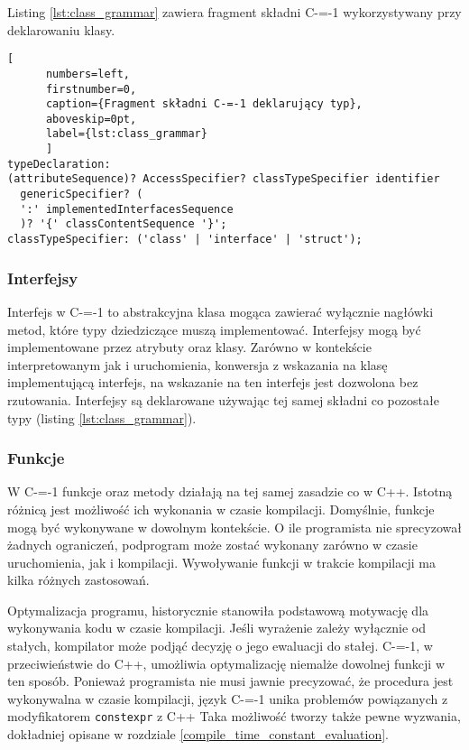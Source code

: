 Listing \ref{lst:class_grammar} zawiera fragment składni C-=-1 wykorzystywany przy deklarowaniu klasy.

\begin{minipage}{\linewidth}
  
	\begin{lstlisting}[
	  numbers=left,
	  firstnumber=0,
	  caption={Fragment składni C-=-1 deklarujący typ},
	  aboveskip=0pt,
	  label={lst:class_grammar}
	  ]
typeDeclaration:
(attributeSequence)? AccessSpecifier? classTypeSpecifier identifier 
  genericSpecifier? (
  ':' implementedInterfacesSequence
  )? '{' classContentSequence '}';
classTypeSpecifier: ('class' | 'interface' | 'struct');
  \end{lstlisting}
  \end{minipage}

\subsubsection{Interfejsy}

Interfejs w C-=-1 to abstrakcyjna klasa mogąca zawierać wyłącznie nagłówki metod, które typy dziedziczące muszą implementować.
Interfejsy mogą być implementowane przez atrybuty oraz klasy.
Zarówno w kontekście interpretowanym jak i uruchomienia, konwersja z wskazania na klasę implementującą interfejs, na wskazanie na ten interfejs jest dozwolona bez rzutowania.
Interfejsy są deklarowane używając tej samej składni co pozostałe typy (listing \ref{lst:class_grammar}).


\subsubsection{Funkcje}
W C-=-1 funkcje oraz metody działają na tej samej zasadzie co w C++.
Istotną różnicą jest możliwość ich wykonania w czasie kompilacji.
Domyślnie, funkcje mogą być wykonywane w dowolnym kontekście.
O ile programista nie sprecyzował żadnych ograniczeń, podprogram może zostać wykonany zarówno w czasie uruchomienia, jak i kompilacji.
Wywoływanie funkcji w trakcie kompilacji ma kilka różnych zastosowań.

Optymalizacja programu, historycznie stanowiła podstawową motywację dla wykonywania kodu w czasie kompilacji.
Jeśli wyrażenie zależy wyłącznie od stałych, kompilator może podjąć decyzję o jego ewaluacji do stałej.
C-=-1, w przeciwieństwie do C++, umożliwia optymalizację niemalże dowolnej funkcji w ten sposób.
Ponieważ programista nie musi jawnie precyzować, że procedura jest wykonywalna w czasie kompilacji, język C-=-1 unika problemów powiązanych z modyfikatorem \lstinline{constexpr} z C++ \cite{Klimiankou:contexpr_great_good_wrong_idea}
Taka możliwość tworzy także pewne wyzwania, dokładniej opisane w rozdziale \ref{compile_time_constant_evaluation}.

